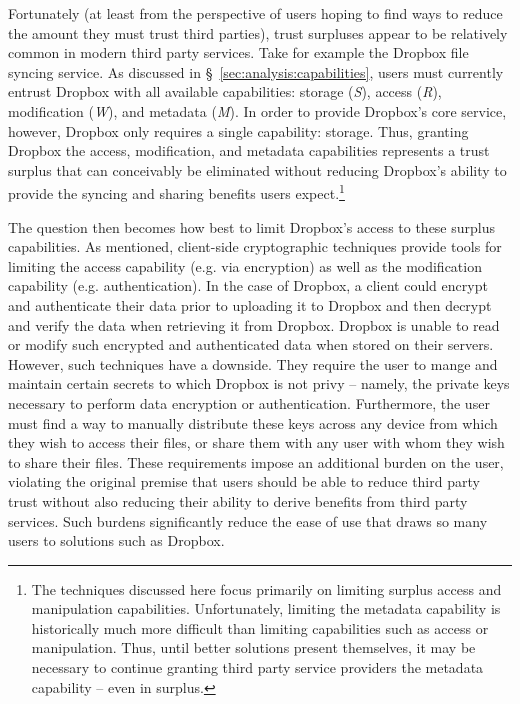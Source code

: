 Fortunately (at least from the perspective of users hoping to find
ways to reduce the amount they must trust third parties), trust
surpluses appear to be relatively common in modern third party
services. Take for example the Dropbox file syncing service. As
discussed in \S~\ref{sec:analysis:capabilities}, users must currently
entrust Dropbox with all available capabilities: storage (\emph{S}),
access (\emph{R}), modification (\emph{W}), and metadata
(\emph{M}). In order to provide Dropbox's core service, however,
Dropbox only requires a single capability: storage. Thus, granting
Dropbox the access, modification, and metadata capabilities represents
a trust surplus that can conceivably be eliminated without reducing
Dropbox's ability to provide the syncing and sharing benefits users
expect.\footnote{The techniques discussed here focus primarily on
  limiting surplus access and manipulation
  capabilities. Unfortunately, limiting the metadata capability is
  historically much more difficult than limiting capabilities such as
  access or manipulation. Thus, until better solutions present
  themselves, it may be necessary to continue granting third party
  service providers the metadata capability -- even in surplus.}

The question then becomes how best to limit Dropbox's access to these
surplus capabilities. As mentioned, client-side cryptographic
techniques provide tools for limiting the access capability (e.g. via
encryption) as well as the modification capability
(e.g. authentication). In the case of Dropbox, a client could encrypt
and authenticate their data prior to uploading it to Dropbox and then
decrypt and verify the data when retrieving it from Dropbox. Dropbox
is unable to read or modify such encrypted and authenticated data when
stored on their servers. However, such techniques have a
downside. They require the user to mange and maintain certain secrets
to which Dropbox is not privy -- namely, the private keys necessary to
perform data encryption or authentication. Furthermore, the user must
find a way to manually distribute these keys across any device from
which they wish to access their files, or share them with any user
with whom they wish to share their files. These requirements impose an
additional burden on the user, violating the original premise that
users should be able to reduce third party trust without also reducing
their ability to derive benefits from third party services. Such
burdens significantly reduce the ease of use that draws so many users
to solutions such as Dropbox.

